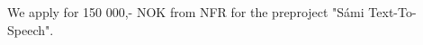 \documentclass[a4paper,english]{article}
\begin{document}
We apply for 150 000,- NOK from NFR for the preproject "Sámi Text-To-Speech".




\end{document}

